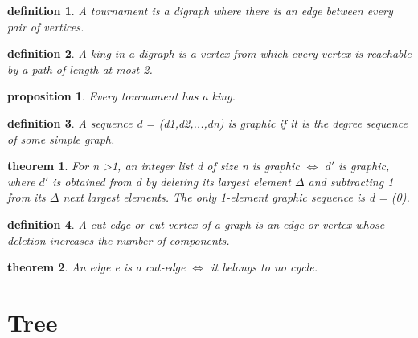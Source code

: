 \documentclass[2pt]{article}
\newtheorem{theorem}{theorem}[section]  %
\newtheorem{definition}{definition}
\newtheorem{proposition}{proposition}
\begin{document}
\begin{CJK*}{UTF8}{bkai}
\begin{paracol}{2}
    \begin{definition}
        A tournament is a digraph where there is an edge between every pair of
 vertices.
    \end{definition}

    \begin{definition}
         A king in a digraph is a vertex from which every vertex is reachable by a path
 of length at most 2.
    \end{definition}

    \begin{proposition}
        Every tournament has a king.
    \end{proposition}

    \begin{definition}
         A sequence d = (d1,d2,...,dn) is graphic if it is the degree sequence of some
 simple graph.
    \end{definition}

    \begin{theorem}
         For n >1, an integer list d of size n is graphic $\iff$ $d\prime$ is graphic, where $d\prime$ is
 obtained from d by deleting its largest element $\Delta$ and subtracting 1 from its $\Delta$
 next largest elements. The only 1-element graphic sequence is d = (0).
    \end{theorem}

    \begin{definition}
         A cut-edge or cut-vertex of a graph is an edge or vertex whose deletion
 increases the number of components.
    \end{definition}

    \begin{theorem}
        An edge e is a cut-edge $\iff$ it belongs to no cycle.
    \end{theorem}

    
    
\end{paracol}
\vspace{2cm} %

\section*{Tree}
\begin{paracol}{2} %
    \switchcolumn[0]


\end{paracol}
\end{CJK*}
\end{document}
